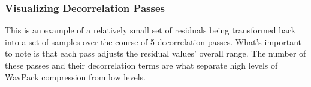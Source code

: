 {\clearpage

\subsubsection{Visualizing Decorrelation Passes}

This is an example of a relatively small set of residuals
being transformed back into a set of samples
over the course of 5 decorrelation passes.
What's important to note is that each pass
adjusts the residual values' overall range.
The number of these passes and their decorrelation terms
are what separate high levels of WavPack compression from low levels.

\begin{figure}[h]
  \newline
  \newline
\end{figure}


\clearpage

}
